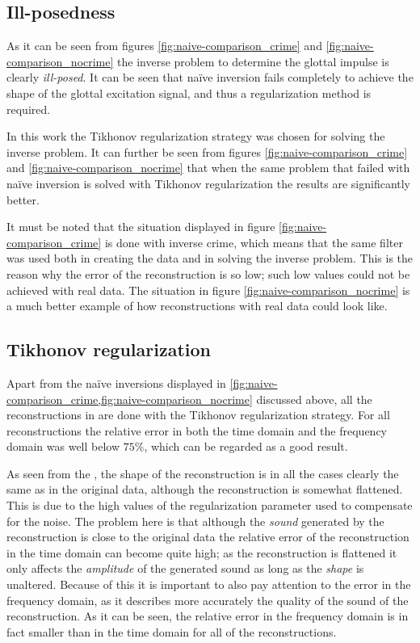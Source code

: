\documentclass[12pt,a4]{article}
\begin{document}
\subsection{Ill-posedness}

As it can be seen from figures \ref{fig:naive-comparison_crime} and \ref{fig:naive-comparison_nocrime} the inverse problem to determine the glottal impulse is clearly \emph{ill-posed}. It can be seen that naïve inversion fails completely to achieve the shape of the glottal excitation signal, and thus a regularization method is required.

In this work the Tikhonov regularization strategy was chosen for solving the inverse problem. It can further be seen from figures \ref{fig:naive-comparison_crime} and \ref{fig:naive-comparison_nocrime} that when the same problem that failed with naïve inversion is solved with Tikhonov regularization the results are significantly better.

It must be noted that the situation displayed in figure \ref{fig:naive-comparison_crime} is done with inverse crime, which means that the same filter was used both in creating the data and in solving the inverse problem. This is the reason why the error of the reconstruction is so low; such low values could not be achieved with real data. The situation in figure \ref{fig:naive-comparison_nocrime} is a much better example of how reconstructions with real data could look like.

\subsection{Tikhonov regularization}
\label{sec:tikDiscussion}

Apart from the naïve inversions displayed in \cref{fig:naive-comparison_crime,fig:naive-comparison_nocrime} discussed above, all the reconstructions in  are done with the Tikhonov regularization strategy. For all reconstructions the relative error in both the time domain and the frequency domain was well below $75 \%$, which can be regarded as a good result.

As seen from the , the shape of the reconstruction is in all the cases clearly the same as in the original data, although the reconstruction is somewhat flattened. This is due to the high values of the regularization parameter used to compensate for the noise. The problem here is that although the \emph{sound} generated by the reconstruction is close to the original data the relative error of the reconstruction in the time domain can become quite high; as the reconstruction is flattened it only affects the \emph{amplitude} of the generated sound as long as the \emph{shape} is unaltered. Because of this it is important to also pay attention to the error in the frequency domain, as it describes more accurately the quality of the sound of the reconstruction. As it can be seen, the relative error in the frequency domain is in fact smaller than in the time domain for all of the reconstructions.
\end{document}
